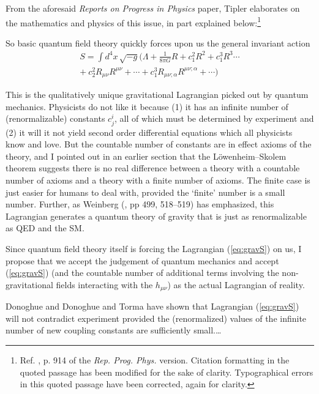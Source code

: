 \documentclass[letterpaper,12pt]{article}
\newenvironment{squotation}
  {\small\quotation}
  {\endquotation\normalsize}
\begin{document}
From the aforesaid \emph{Reports on Progress in Physics} paper, Tipler elaborates on the mathematics and physics of this issue, in part explained below:\footnote{Ref. , p. 914 of the \emph{Rep. Prog. Phys.} version. Citation formatting in the quoted passage has been modified for the sake of clarity. Typographical errors in this quoted passage have been corrected, again for clarity.}

\begin{squotation}
So basic quantum field theory quickly forces upon us the general invariant action \begin{align*}
S = \int d^4x\, \sqrt{-g}\bigg(\Lambda + \frac{1}{8\pi G}R + c^2_1R^2 + c^3_1R^3 \cdots\nonumber\\
+\ c^2_2R_{\mu\nu}R^{\mu\nu} + \cdots + c^3_1R_{\mu\nu;\alpha}R^{\mu\nu;\alpha} + \cdots\bigg)
\tag{3}
\label{eq:gravS}
\end{align*}

This is the qualitatively unique gravitational Lagrangian picked out by quantum mechanics. Physicists do not like it because (1) it has an infinite number of (renormalizable) constants \( c^i_j \), all of which must be determined by experiment and (2) it will it not yield second order differential equations which all physicists know and love. But the countable number of constants are in effect axioms of the theory, and I pointed out in an earlier section that the L\"owenheim--Skolem theorem suggests there is no real difference between a theory with a countable number of axioms and a theory with a finite number of axioms. The finite case is just easier for humans to deal with, provided the `finite' number is a small number. Further, as Weinberg (\cite{Weinberg1995}, pp 499, 518--519) has emphasized, this Lagrangian generates a quantum theory of gravity that is just as renormalizable as \gls{QED} and the \gls{SM}.

Since quantum field theory itself is forcing the Lagrangian (\ref{eq:gravS}) on us, I propose that we accept the judgement of quantum mechanics and accept (\ref{eq:gravS}) (and the countable number of additional terms involving the non-gravitational fields interacting with the \( h_{\mu\nu} \)) as the actual Lagrangian of reality.

Donoghue \cite{Donoghue1994} and Donoghue and Torma \cite{DonoghueTorma1996} have shown that Lagrangian (\ref{eq:gravS}) will not contradict experiment provided the (renormalized) values of the infinite number of new coupling constants are sufficiently small.\thinspace\ldots
\end{squotation}
\end{document}
